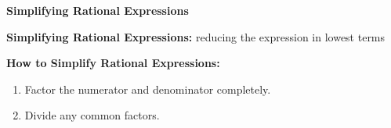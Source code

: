 
\begin{center}
\textbf{Simplifying Rational Expressions 
}
\end{center}

\vspce

\textbf{Simplifying Rational Expressions:} reducing the expression in lowest terms 

\vspce

\textbf{How to Simplify Rational Expressions:}
\begin{enumerate}
\item Factor the numerator and denominator completely. 
\item Divide any common factors.
\end{enumerate}


